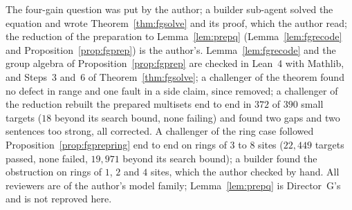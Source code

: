 The four-gain question was put by the author; a builder sub-agent solved the equation and wrote Theorem~\ref{thm:fgsolve} and its proof, which the author read; the reduction of the preparation to Lemma~\ref{lem:prepq} (Lemma~\ref{lem:fgrecode} and Proposition~\ref{prop:fgprep}) is the author's. Lemma~\ref{lem:fgrecode} and the group algebra of Proposition~\ref{prop:fgprep} are checked in Lean~4 with Mathlib, and Steps~3 and~6 of Theorem~\ref{thm:fgsolve}; a challenger of the theorem found no defect in range and one fault in a side claim, since removed; a challenger of the reduction rebuilt the prepared multisets end to end in $372$ of $390$ small targets ($18$ beyond its search bound, none failing) and found two gaps and two sentences too strong, all corrected. A challenger of the ring case followed Proposition~\ref{prop:fgprepring} end to end on rings of $3$ to $8$ sites ($22{,}449$ targets passed, none failed, $19{,}971$ beyond its search bound); a builder found the obstruction on rings of $1$, $2$ and $4$ sites, which the author checked by hand. All reviewers are of the author's model family; Lemma~\ref{lem:prepq} is Director~G's and is not reproved here.
